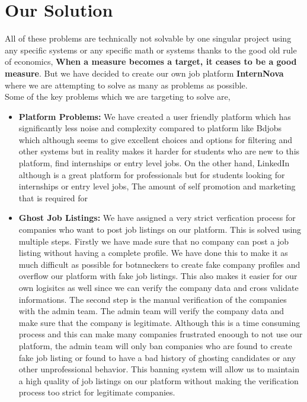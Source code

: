 \documentclass[a4paper, 14pt, openany]{extreport}
\begin{document}
	\section{Our Solution}
	All of these problems are technically not solvable by one singular project using any specific systems or any specific math or systems thanks to the good old rule of economics, \textbf{When a measure becomes a target, it ceases to be a good measure}. But we have decided to create our own job platform \textbf{InternNova} where we are attempting to solve as many as problems as possible.
	\\
	
	Some of the key problems which we are targeting to solve are,
	\begin{itemize}
		\item \textbf{Platform Problems:} We have created a user friendly platform which has significantly less noise and complexity compared to platform like Bdjobs\cite{bdjobs} which although seems to give excellent choices and options for filtering and other systems but in reality makes it harder for students who are new to this platform, find internships or entry level jobs. On the other hand, LinkedIn\cite{linkedin} although is a great platform for professionals but for students looking for internships or entry level jobs, The amount of self promotion and marketing that is required for 
		\item \textbf{Ghost Job Listings:} We have assigned a very strict verfication process for companies who want to post job listings on our platform. This is solved using multiple steps. Firstly we have made sure that no company can post a job listing without having a complete profile. We have done this to make it as much difficult as possible for botnneckers to create fake company profiles and overflow our platform with fake job listings. This also makes it easier for our own logisitcs as well since we can verify the company data and cross validate informations. The second step is the manual verification of the companies with the admin team. The admin team will verify the company data and make sure that the company  is legitimate. Although this is a time consuming process and this can make many companies frustrated enoough to not use our platform, the admin team will only ban companies who are found to create fake job listing or found to have a bad history of ghosting candidates or any other unprofessional behavior. This banning system will allow us to maintain a high quality of job listings on our platform without making the verification process too strict for legitimate companies.

\end{itemize}
\end{document}
